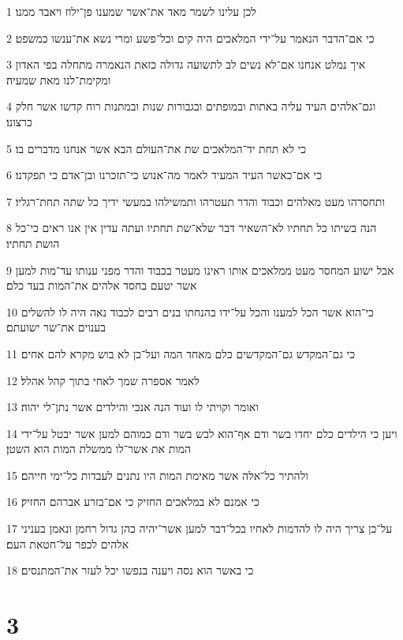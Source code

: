 \par 1 לכן עלינו לשמר מאד את־אשר שמענו פן־ילוז ויאבד ממנו׃
\par 2 כי אם־הדבר הנאמר על־ידי המלאכים היה קים וכל־פשע ומרי נשא את־ענשו כמשפט׃
\par 3 איך נמלט אנחנו אם־לא נשים לב לתשועה גדולה כזאת הנאמרה מתחלה בפי האדון ומקימת־לנו מאת שמעיה׃
\par 4 וגם־אלהים העיד עליה באתות ובמופתים ובגבורות שנות ובמתנות רוח קדשו אשר חלק כרצונו׃
\par 5 כי לא תחת יד־המלאכים שת את־העולם הבא אשר אנחנו מדברים בו׃
\par 6 כי אם־כאשר העיד המעיד לאמר מה־אנוש כי־תזכרנו ובן־אדם כי תפקדנו׃
\par 7 ותחסרהו מעט מאלהים וכבוד והדר תעטרהו ותמשילהו במעשי ידיך כל שתה תחת־רגליו׃
\par 8 הנה בשיתו כל תחתיו לא־השאיר דבר שלא־שת תחתיו ועתה עדין אין אנו ראים כי־כל הושת תחתיו׃
\par 9 אבל ישוע המחסר מעט ממלאכים אותו ראינו מעטר בכבוד והדר מפני ענותו עד־מות למען אשר יטעם בחסד אלהים את־המות בעד כלם׃
\par 10 כי־הוא אשר הכל למענו והכל על־ידו בהנחתו בנים רבים לכבוד נאה היה לו להשלים בענוים את־שר ישועתם׃
\par 11 כי גם־המקדש גם־המקדשים כלם מאחד המה ועל־כן לא בוש מקרא להם אחים׃
\par 12 לאמר אספרה שמך לאחי בתוך קהל אהלל׃
\par 13 ואומר וקויתי לו ועוד הנה אנכי והילדים אשר נתן־לי יהוה׃
\par 14 ויען כי הילדים כלם יחדו בשר ודם אף־הוא לבש בשר ודם כמוהם למען אשר יבטל על־ידי המות את אשר־לו ממשלת המות הוא השטן׃
\par 15 ולהתיר כל־אלה אשר מאימת המות היו נתנים לעבדות כל־ימי חייהם׃
\par 16 כי אמנם לא במלאכים החזיק כי אם־בזרע אברהם החזיק׃
\par 17 על־כן צריך היה לו להדמות לאחיו בכל־דבר למען אשר־יהיה כהן גדול רחמן ונאמן בעניני אלהים לכפר על־חטאת העם׃
\par 18 כי באשר הוא נסה ויענה בנפשו יכל לעזר את־המתנסים׃

\chapter{3}

